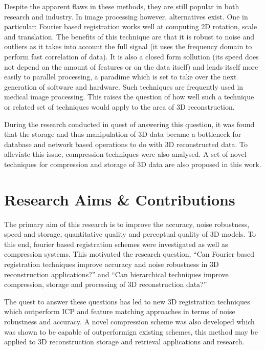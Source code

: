 Despite the apparent flaws in these methods, they are still popular in both research and industry. In image processing however, alternatives exist. One in particular: Fourier based registration works well at computing 2D rotation, scale and translation. The benefits of this technique are that it is robust to noise and outliers as it takes into account the full signal (it uses the frequency domain to perform fast correlation of data). It is also a closed form sollution (its speed does not depend on the amount of features or on the data itself) and lends itself more easily to parallel processing, a paradime which is set to take over the next generation of software and hardware. Such techniques are frequently used in medical image processing. This raises the question of how well such a technique or related set of techniques would apply to the area of 3D reconstruction.

During the research conducted in quest of answering this question, it was found that the storage and thus manipulation of 3D data became a bottleneck for database and network based operations to do with 3D reconstructed data. To alleviate this issue, compression techniques were also analysed. A set of novel techniques for compression and storage of 3D data are also proposed in this work.  

\section{Research Aims \& Contributions}

The primary aim of this research is to improve the accuracy, noise robustness, speed and storage, quantitative quality and perceptual quality of 3D models. To this end, fourier based registration schemes were investigated as well as compression systems. This motivated the research question, ``Can Fourier based registration techniques improve accuracy and noise robustness in 3D reconstruction applications?'' and ``Can hierarchical techniques improve compression, storage and processing of 3D reconstruction data?'' 

The quest to answer these questions has led to new 3D registration techniques \cite{Lincoln13Interpolating} which outperform ICP and feature matching approaches in terms of noise robustness and accuracy. A novel compression scheme was also developed which was shown to be capable of outperformign existing schemes, this method may be applied to 3D reconstruction storage and retrieval applications and research.

